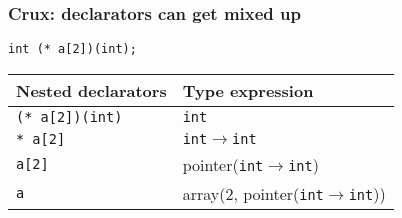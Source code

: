 \documentclass{beamer}
\begin{document}
\begin{frame}
    \frametitle{Crux: declarators can get mixed up}

    \begin{example}
        \lstinline{int (* a[2])(int);}
        \\
        \begin{center}
            \begin{tabular}{l |l}
                Nested declarators & Type expression                     \\
                \hline \hline
                \lstinline{(* a[2])(int)}    & \lstinline{int}                              \\
                \lstinline{* a[2]}   & \lstinline{int}$\rightarrow$\lstinline{int}  \\
                \lstinline{a[2]}   & pointer(\lstinline{int}$\rightarrow$\lstinline{int}) \\
                \lstinline{a}    & array(2, pointer(\lstinline{int}$\rightarrow$\lstinline{int}))
            \end{tabular}
        \end{center}
    \end{example}
\end{frame}
\end{document}
